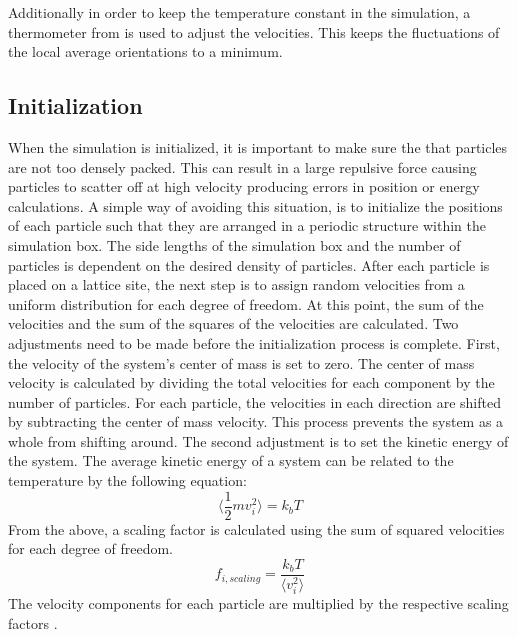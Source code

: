 \documentclass[preprint, aps]{revtex4-1}
\begin{document}
Additionally in order to keep the temperature constant in the simulation, a
thermometer from \cite{ilnytskyi02} is used to adjust the velocities. This keeps 
the fluctuations of the local average orientations to a minimum.

\subsection*{Initialization}
When the simulation is initialized, it is important to make sure the that 
particles are not too densely packed. This can result in a large repulsive force
causing particles to scatter off at high velocity producing errors in position 
or energy calculations. A simple way of avoiding this situation, is to 
initialize the positions of each particle such that they are arranged in a 
periodic structure within the simulation box. The side lengths of the simulation
box and the number of particles is dependent on the desired density of
particles. After each particle is placed on a lattice site, the next step is to
assign random velocities from a uniform distribution for each degree of freedom.
At this point, the sum of the velocities and the sum of the squares of the
velocities are calculated. Two adjustments need to be made before the
initialization process is complete. First, the velocity of the system's center
of mass is set to zero. The center of mass velocity is calculated by dividing
the total velocities for each component by the number of particles. For each
particle, the velocities in each direction are shifted by subtracting the center
of mass velocity. This process prevents the system as a whole from shifting
around. The second adjustment is to set the kinetic energy of the system. The
average kinetic energy of a system can be related to the temperature by the 
following equation:
	\begin{equation}
		\langle \frac{1}{2}mv_i^2 \rangle=k_bT
	\end{equation}
From the above, a scaling factor is calculated using the sum of squared 
velocities for each degree of freedom.
	\begin{equation}
		f_{i,scaling}=\frac{k_bT}{\langle v_i^2 \rangle}
	\end{equation}
The velocity components for each particle are multiplied by the respective 
scaling factors \cite{frenkel01}. 
\end{document}
